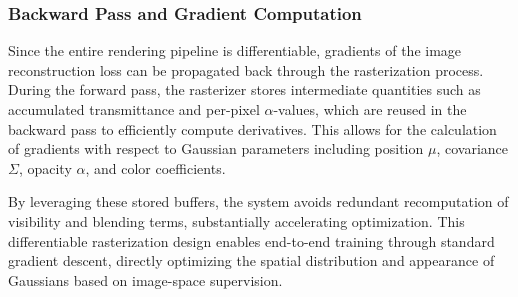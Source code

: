 \subsubsection{Backward Pass and Gradient Computation}

Since the entire rendering pipeline is differentiable, gradients of the image reconstruction loss can be propagated back through the rasterization process. 
During the forward pass, the rasterizer stores intermediate quantities such as accumulated transmittance and per-pixel \(\alpha\)-values, which are reused in the backward pass to efficiently compute derivatives. 
This allows for the calculation of gradients with respect to Gaussian parameters including position \(\mu\), covariance \(\Sigma\), opacity \(\alpha\), and color coefficients.

By leveraging these stored buffers, the system avoids redundant recomputation of visibility and blending terms, substantially accelerating optimization. 
This differentiable rasterization design enables end-to-end training through standard gradient descent, directly optimizing the spatial distribution and appearance of Gaussians based on image-space supervision.
